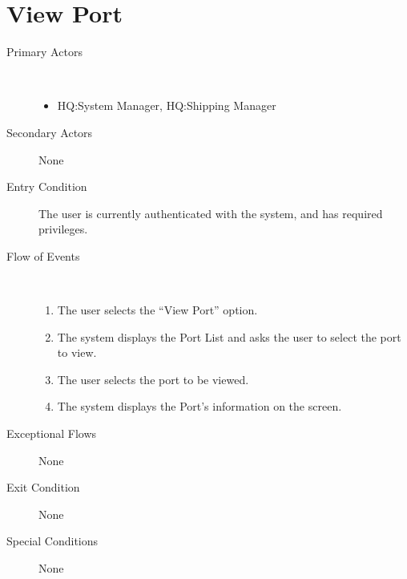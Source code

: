 \documentclass[a4paper,10pt]{report}
\begin{document}
\section{View Port}
\begin{description}
\item[Primary Actors] \
  \begin{itemize}
  \item HQ:System Manager, HQ:Shipping Manager
  \end{itemize}
\item[Secondary Actors] None
\item[Entry Condition]
  The user is currently authenticated with the system, and has required privileges.
\item[Flow of Events] \
  \begin{enumerate}
  \item The user selects the ``View Port'' option.
  \item The system displays the Port List and asks the user to select the port to view.
  \item The user selects the port to be viewed.
  \item The system displays the Port's information on the screen.
  \end{enumerate}
\item[Exceptional Flows] None
\item[Exit Condition] None
\item[Special Conditions] None
\end{description}
\end{document}
